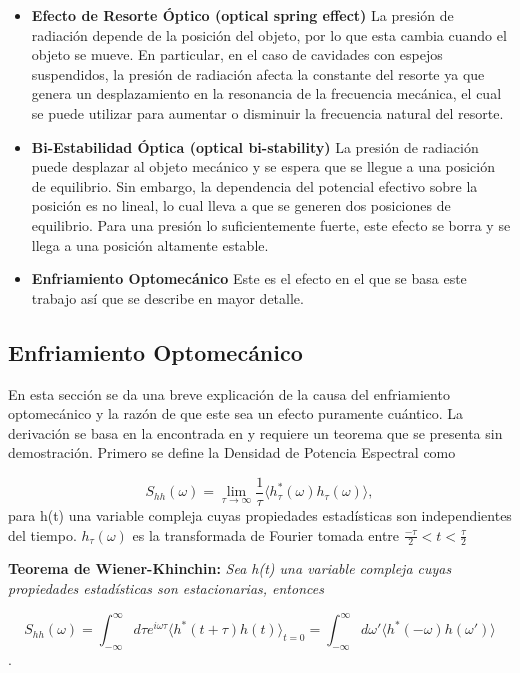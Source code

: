 \documentclass[10pt,a4paper]{report}
\begin{document}
\begin{itemize}
\item \textbf{Efecto de Resorte Óptico (optical spring effect)} La
  presión de radiación depende de la posición del objeto, por lo que esta
  cambia cuando el objeto se mueve. En particular, en el caso de
  cavidades con espejos suspendidos, la presión de radiación afecta la
  constante del resorte ya que genera un desplazamiento en la
  resonancia de la frecuencia mecánica, el cual se puede utilizar para
  aumentar o disminuir la frecuencia natural del
  resorte.\cite{BraginskyPE}

\item \textbf{Bi-Estabilidad Óptica (optical bi-stability)} La presión
  de radiación puede desplazar al objeto mecánico y se espera que se
  llegue a una posición de equilibrio. Sin embargo, la dependencia del
  potencial efectivo sobre la posición es no lineal, lo cual lleva a
  que se generen dos posiciones de equilibrio. Para una presión lo
  suficientemente fuerte, este efecto se borra y se llega a una
  posición altamente estable\cite{DorselOB}.

\item \textbf{Enfriamiento Optomecánico} Este es el efecto en el que se basa este trabajo así que se describe en mayor detalle. 
\end{itemize}

\subsection{Enfriamiento Optomecánico}

En esta sección se da una breve explicación de la causa del enfriamiento optomecánico y la razón de que este sea un efecto puramente cuántico. La derivación se basa en la encontrada en \cite{WarwickQO} y requiere un teorema que se presenta sin demostración. Primero se define la  Densidad de Potencia Espectral como

\begin{equation}
S_{hh}(\omega) = \lim_{\tau \to\infty} \frac{1}{\tau}\langle h_\tau^*(\omega)h_\tau(\omega) \rangle ,
\end{equation} para h(t) una variable compleja cuyas propiedades estadísticas son independientes del tiempo. $h_\tau(\omega)$ es la transformada de Fourier tomada entre $\frac{-\tau}{2}< t < \frac{\tau}{2}$

\begin{center}
\textbf{Teorema de Wiener-Khinchin:} \textit{Sea h(t) una variable compleja cuyas propiedades estadísticas son estacionarias, entonces }

\begin{equation} \label{WienerKhichin}
S_{hh}(\omega) = \int_{-\infty}^\infty d\tau e^{i\omega \tau} \langle h^*(t+\tau)h(t) \rangle_{t=0} = \int_{-\infty}^\infty d\omega' \langle h^*(-\omega) h(\omega') \rangle
\end{equation}
.
\end{center}
\end{document}
